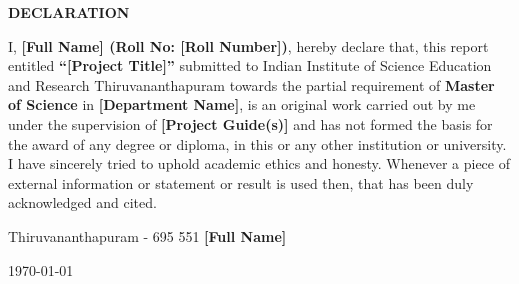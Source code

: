  \setcounter{page}{2}
\begin{center}
{\Large{\bf{DECLARATION}}}
\end{center}

\noindent

I, \textbf{[Full Name] (Roll No: [Roll Number])}, hereby declare that, this report entitled \textbf{``[Project Title]”} submitted to Indian Institute of Science Education and Research Thiruvananthapuram towards the partial requirement of \textbf{Master of Science} in \textbf{[Department Name]}, is an original work carried out by me under the supervision of \textbf{[Project Guide(s)]} and has not formed the basis for the award of any degree or diploma, in this or any other institution or university. I have sincerely tried to uphold academic ethics and honesty. Whenever a piece of external information or statement or result is used then, that has been duly acknowledged and cited.

\vspace{4cm} %

\noindent Thiruvananthapuram - 695 551 \hfill \textbf{[Full Name]}

\noindent \today \hfill

\clearpage
